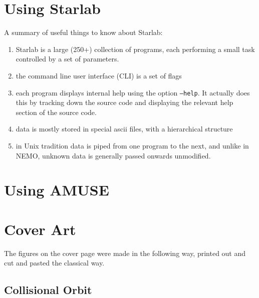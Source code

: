\chapter                {Using Starlab}

A summary of useful things to know about Starlab:


\begin{enumerate}

\item
Starlab is a large (250+) collection of programs, each performing a small task
controlled by a set of parameters.

\item
the command line user interface (CLI) is a set of flags

\item
each program displays internal help using the option {\tt --help}.
It actually does this by tracking down the source code
and displaying the relevant help section of the source code.

\item
data is mostly stored in special ascii files, with a hierarchical structure

\item
in Unix tradition data is piped from one program to the next, and unlike
in NEMO, unknown data is generally passed onwards unmodified.

\end{enumerate}

\chapter                {Using AMUSE}


\chapter                {Cover Art}

The figures on the cover page were made in the following way, printed out
and cut and pasted the classical way.

\section{Collisional Orbit}
\label{s:pyth} 


